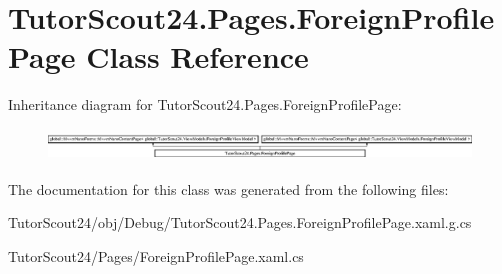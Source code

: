\hypertarget{class_tutor_scout24_1_1_pages_1_1_foreign_profile_page}{}\section{Tutor\+Scout24.\+Pages.\+Foreign\+Profile\+Page Class Reference}
\label{class_tutor_scout24_1_1_pages_1_1_foreign_profile_page}
Inheritance diagram for Tutor\+Scout24.\+Pages.\+Foreign\+Profile\+Page\+:\begin{figure}[H]
\begin{center}
\leavevmode
\includegraphics[height=0.847201cm]{class_tutor_scout24_1_1_pages_1_1_foreign_profile_page}
\end{center}
\end{figure}


The documentation for this class was generated from the following files\+:\begin{DoxyCompactItemize}
\item 
Tutor\+Scout24/obj/\+Debug/Tutor\+Scout24.\+Pages.\+Foreign\+Profile\+Page.\+xaml.\+g.\+cs\item 
Tutor\+Scout24/\+Pages/Foreign\+Profile\+Page.\+xaml.\+cs\end{DoxyCompactItemize}
